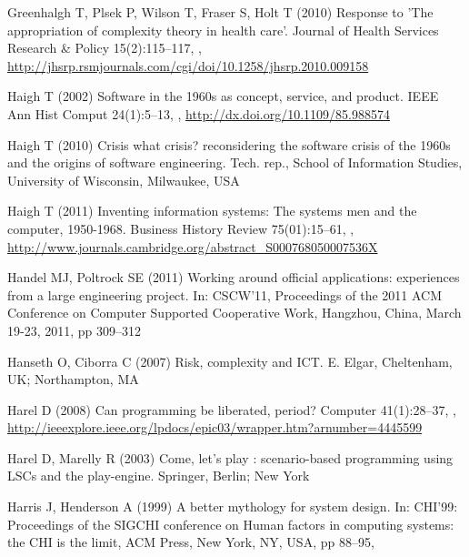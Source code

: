 \documentclass{article}
\begin{document}
\begin{thebibliography}{193}
Greenhalgh T, Plsek P, Wilson T, Fraser S, Holt T (2010) Response to {'The}
  appropriation of complexity theory in health care'. Journal of Health
  Services Research \& Policy 15(2):115--117, ,
  \urlprefix\url{http://jhsrp.rsmjournals.com/cgi/doi/10.1258/jhsrp.2010.009158}

Haigh T (2002) Software in the 1960s as concept, service, and product. {IEEE}
  Ann Hist Comput 24(1):5--13, ,
  \urlprefix\url{http://dx.doi.org/10.1109/85.988574}

Haigh T (2010) Crisis what crisis? reconsidering the software crisis of the
  1960s and the origins of software engineering. Tech. rep., School of
  Information Studies, University of Wisconsin, Milwaukee, {USA}

Haigh T (2011) Inventing information systems: The systems men and the computer,
  1950-1968. Business History Review 75(01):15--61, ,
  \urlprefix\url{http://www.journals.cambridge.org/abstract_S000768050007536X}

Handel MJ, Poltrock SE (2011) Working around official applications: experiences
  from a large engineering project. In: {CSCW'11}, Proceedings of the 2011
  {ACM} Conference on Computer Supported Cooperative Work, Hangzhou, China,
  March 19-23, 2011, pp 309--312

Hanseth O, Ciborra C (2007) Risk, complexity and {ICT}. E. Elgar, Cheltenham,
  {UK;} Northampton, {MA}

Harel D (2008) Can programming be liberated, period? Computer 41(1):28--37,
  ,
  \urlprefix\url{http://ieeexplore.ieee.org/lpdocs/epic03/wrapper.htm?arnumber=4445599}

Harel D, Marelly R (2003) Come, let's play : scenario-based programming using
  {LSCs} and the play-engine. Springer, Berlin; New York

Harris J, Henderson A (1999) A better mythology for system design. In:
  {CHI'99:} Proceedings of the {SIGCHI} conference on Human factors in
  computing systems: the {CHI} is the limit, {ACM} Press, New York, {NY},
  {USA}, pp 88--95, 


\end{thebibliography}
\end{document}
